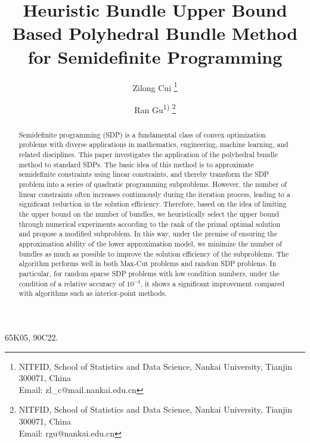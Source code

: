 \documentclass{jcmlatex}
\begin{document}

\title{Heuristic Bundle Upper Bound Based Polyhedral Bundle Method for Semidefinite Programming}

\author{Zilong Cui
\thanks{NITFID, School of Statistics and Data Science, Nankai University, Tianjin 300071, China\\ Email: zl\_c@mail.nankai.edu.cn}
\and
Ran Gu\textsuperscript{1)}
\thanks{NITFID, School of Statistics and Data Science, Nankai University, Tianjin 300071, China\\ Email: rgu@nankai.edu.cn}}
\maketitle

\begin{abstract}
Semidefinite programming (SDP) is a fundamental class of convex optimization problems with diverse applications in mathematics, engineering, machine learning, and related disciplines. This paper investigates the application of the polyhedral bundle method to standard SDPs. The basic idea of this method is to approximate semidefinite constraints using linear constraints, and thereby transform the SDP problem into a series of quadratic programming subproblems. However, the number of linear constraints often increases continuously during the iteration process, leading to a significant reduction in the solution efficiency. Therefore, based on the idea of limiting the upper bound on the number of bundles, we heuristically select the upper bound through numerical experiments according to the rank of the primal optimal solution and propose a modified subproblem. In this way, under the premise of ensuring the approximation ability of the lower approximation model, we minimize the number of bundles as much as possible to improve the solution efficiency of the subproblems. The algorithm performs well in both Max-Cut problems and random SDP problems. In particular, for random sparse SDP problems with low condition numbers, under the condition of a relative accuracy of \(10^{-4}\), it shows a significant improvement compared with algorithms such as interior-point methods.
\end{abstract}

\begin{classification}
65K05, 90C22.
\end{classification}
\end{document}
